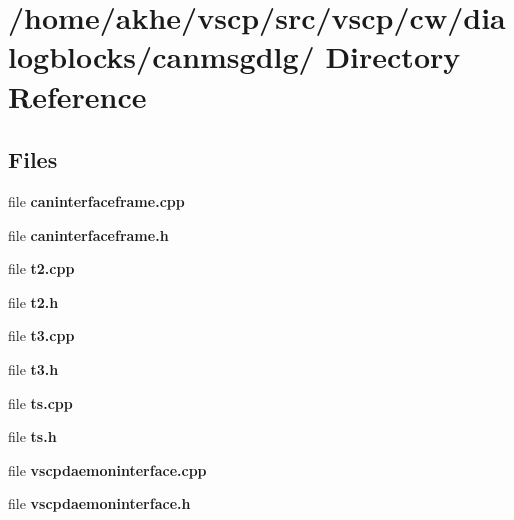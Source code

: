 \section{/home/akhe/vscp/src/vscp/cw/dialogblocks/canmsgdlg/ Directory Reference}
\label{dir_dc4b6c0de02e60cc89476a3ce5757a3b}
\subsection*{Files}
\begin{CompactItemize}
\item 
file \textbf{caninterfaceframe.cpp}
\item 
file \textbf{caninterfaceframe.h}
\item 
file \textbf{t2.cpp}
\item 
file \textbf{t2.h}
\item 
file \textbf{t3.cpp}
\item 
file \textbf{t3.h}
\item 
file \textbf{ts.cpp}
\item 
file \textbf{ts.h}
\item 
file \textbf{vscpdaemoninterface.cpp}
\item 
file \textbf{vscpdaemoninterface.h}
\end{CompactItemize}
